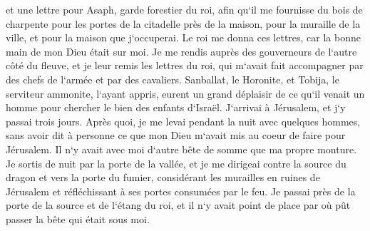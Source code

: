 \verse et une lettre pour Asaph, garde forestier du roi, afin qu`il me fournisse du bois de charpente pour les portes de la citadelle près de la maison, pour la muraille de la ville, et pour la maison que j`occuperai. Le roi me donna ces lettres, car la bonne main de mon Dieu était sur moi. 
\verse Je me rendis auprès des gouverneurs de l`autre côté du fleuve, et je leur remis les lettres du roi, qui m`avait fait accompagner par des chefs de l`armée et par des cavaliers. 
\verse Sanballat, le Horonite, et Tobija, le serviteur ammonite, l`ayant appris, eurent un grand déplaisir de ce qu`il venait un homme pour chercher le bien des enfants d`Israël. 
\verse J`arrivai à Jérusalem, et j`y passai trois jours. 
\verse Après quoi, je me levai pendant la nuit avec quelques hommes, sans avoir dit à personne ce que mon Dieu m`avait mis au coeur de faire pour Jérusalem. Il n`y avait avec moi d`autre bête de somme que ma propre monture. 
\verse Je sortis de nuit par la porte de la vallée, et je me dirigeai contre la source du dragon et vers la porte du fumier, considérant les murailles en ruines de Jérusalem et réfléchissant à ses portes consumées par le feu. 
\verse Je passai près de la porte de la source et de l`étang du roi, et il n`y avait point de place par où pût passer la bête qui était sous moi. 

